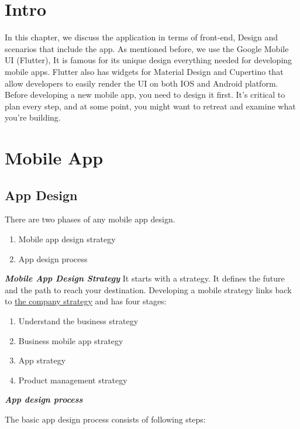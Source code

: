 \newline
\newline
\hfill

\section{Intro}
In this chapter, we discuss the application in terms of front-end, Design and scenarios that include the app.
As mentioned before, we use the Google Mobile UI (Flutter),
It is famous for its unique design everything needed for developing mobile apps. Flutter also has widgets for Material Design and Cupertino that allow developers to easily render the UI on both IOS and Android platform.
Before developing a new mobile app, you need to design it first. It’s critical to plan every step, and at some point, you might want to retreat and examine what you’re building.

\section{Mobile App}
\subsection{ App Design }
There are two phases of any mobile app design.
\begin{enumerate}
\item Mobile app design strategy
\item App design process
\end{enumerate}
\textbf{\textit{Mobile App Design Strategy}}
It starts with a strategy. It defines the future and the path to reach your destination.
Developing a mobile strategy links back to  \underline{the company strategy}  and has four stages:
\begin{enumerate}
\item Understand the business strategy
\item Business mobile app strategy
\item App strategy
\item Product management strategy
\end{enumerate}

\textbf{\textit{App design process}} \par
The basic app design process consists of following steps:


